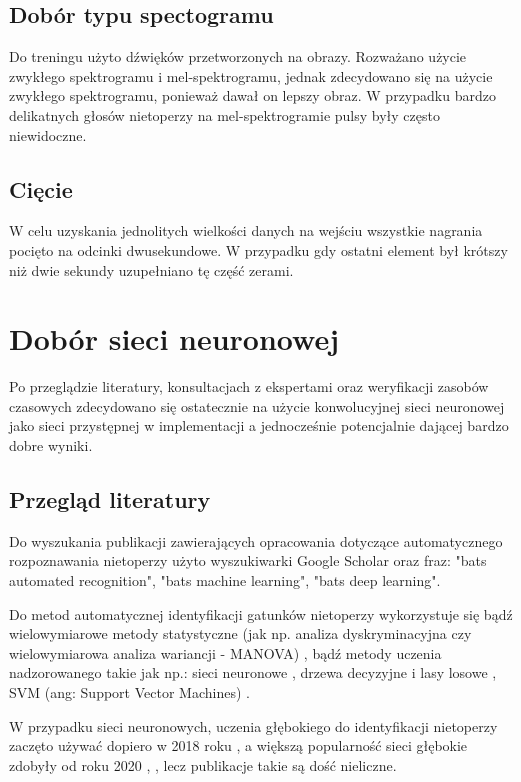 \documentclass{sprz}
\begin{document}
\subsection{Dobór typu spectogramu}
Do treningu użyto dźwięków przetworzonych na obrazy. Rozważano użycie zwykłego spektrogramu i mel-spektrogramu, jednak zdecydowano się na użycie zwykłego spektrogramu, ponieważ dawał on lepszy obraz. W przypadku bardzo delikatnych głosów nietoperzy na mel-spektrogramie pulsy były często niewidoczne.

\subsection{Cięcie}
W celu uzyskania jednolitych wielkości danych na wejściu wszystkie nagrania pocięto na odcinki dwusekundowe. W przypadku gdy ostatni element był krótszy niż dwie sekundy uzupełniano tę część zerami.

\section{Dobór sieci neuronowej}
Po przeglądzie literatury, konsultacjach z ekspertami oraz weryfikacji zasobów czasowych zdecydowano się ostatecznie na użycie konwolucyjnej sieci neuronowej jako sieci przystępnej w implementacji a jednocześnie potencjalnie dającej bardzo dobre wyniki.

\subsection{Przegląd literatury}
Do wyszukania publikacji zawierających opracowania dotyczące automatycznego rozpoznawania nietoperzy użyto wyszukiwarki Google Scholar oraz fraz: "bats automated recognition", "bats machine learning", "bats deep learning".

Do metod automatycznej identyfikacji gatunków nietoperzy wykorzystuje się
bądź wielowymiarowe metody statystyczne (jak np. analiza dyskryminacyjna czy wielowymiarowa analiza wariancji - MANOVA) \cite{bats-id-statistics}, bądź metody uczenia nadzorowanego \cite{bats-id-supervised} takie jak np.: sieci neuronowe \cite{bats-id-nn}, drzewa decyzyjne i lasy losowe \cite{bats-random-forest}, SVM (ang: Support Vector Machines) \cite{bats-id-svm}.

W przypadku sieci neuronowych, uczenia głębokiego do identyfikacji nietoperzy zaczęto używać dopiero w 2018 roku \cite{bats-id-dl2018}, a większą popularność sieci głębokie zdobyły od roku 2020 \cite{bats-id-dl2020a}, \cite{bats-id-dl2020b}, lecz publikacje takie są dość nieliczne.
\end{document}
